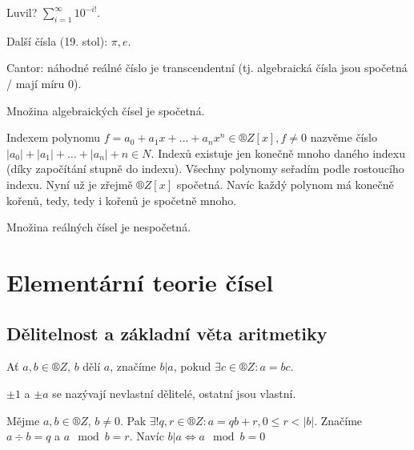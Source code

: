 \documentclass[12pt]{article}                   %
\begin{document}
        \begin{poznamka}
            Luvil? $\sum_{i=1}^∞ 10^{-i!}$.

            Další čísla (19. stol): $\pi, e$.

            Cantor: náhodné reálné číslo je transcendentní (tj. algebraická čísla jsou spočetná / mají míru 0).
        \end{poznamka}

        \begin{tvrzeni}
            Množina algebraických čísel je spočetná.

            \begin{dukazin}
                Indexem polynomu $f = a_0 + a_1x + … + a_nx^n \in ®Z[x], f ≠ 0$ nazvěme číslo $|a_0| + |a_1| + … + |a_n| + n \in N$. Indexů existuje jen konečně mnoho daného indexu (díky započítání stupně do indexu). Všechny polynomy seřadím podle rostoucího indexu. Nyní už je zřejmě $®Z[x]$ spočetná. Navíc každý polynom má konečně kořenů, tedy, tedy i kořenů je spočetně mnoho.
            \end{dukazin}
        \end{tvrzeni}

        \begin{tvrzeni}
            Množina reálných čísel je nespočetná.
        \end{tvrzeni}

\section{Elementární teorie čísel}
    \subsection{Dělitelnost a základní věta aritmetiky}
        \begin{definice}
            Ať $a, b \in ®Z$, $b$ dělí $a$, značíme $b|a$, pokud $\exists c \in ®Z: a = bc$.

            $±1$ a $±a$ se nazývají nevlastní dělitelé, ostatní jsou vlastní.
        \end{definice}

        \begin{tvrzeni}
            Mějme $a, b \in ®Z$, $b≠0$. Pak $\exists! q, r \in ®Z: a = qb+r, 0≤r<|b|$. Značíme $a \div b = q$ a $a \mod b = r$. Navíc $b|a \Leftrightarrow a \mod b = 0$
        \end{tvrzeni}
\end{document}
